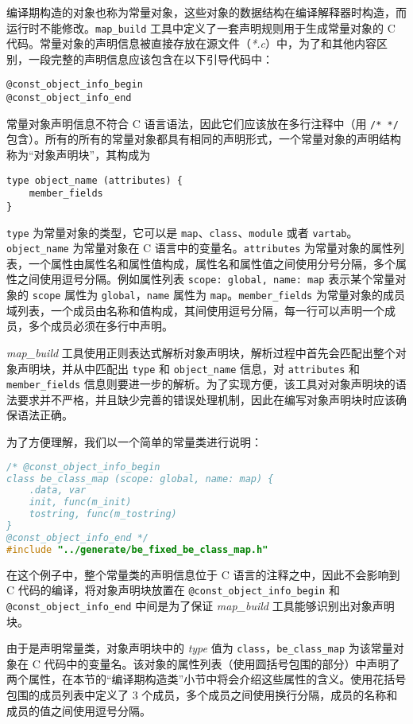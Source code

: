编译期构造的对象也称为常量对象，这些对象的数据结构在编译解释器时构造，而运行时不能修改。\texttt{map\_build} 工具中定义了一套声明规则用于生成常量对象的 C 代码。常量对象的声明信息被直接存放在源文件（\textsl{*.c}）中，为了和其他内容区别，一段完整的声明信息应该包含在以下引导代码中：
\begin{lstlisting}[numbers=none]
@const_object_info_begin
@const_object_info_end
\end{lstlisting}
常量对象声明信息不符合 C 语言语法，因此它们应该放在多行注释中（用 \texttt{/* */} 包含）。所有的所有的常量对象都具有相同的声明形式，一个常量对象的声明结构称为``对象声明块''，其构成为
\begin{lstlisting}[numbers=none]
type object_name (attributes) {
    member_fields
}
\end{lstlisting}
\texttt{type} 为常量对象的类型，它可以是 \texttt{map}、\texttt{class}、\texttt{module} 或者 \texttt{vartab}。\texttt{object\_name} 为常量对象在 C 语言中的变量名。\texttt{attributes} 为常量对象的属性列表，一个属性由属性名和属性值构成，属性名和属性值之间使用分号分隔，多个属性之间使用逗号分隔。例如属性列表 \texttt{scope: global, name: map} 表示某个常量对象的 \texttt{scope} 属性为 \texttt{global}，\texttt{name} 属性为 \texttt{map}。\texttt{member\_fields} 为常量对象的成员域列表，一个成员由名称和值构成，其间使用逗号分隔，每一行可以声明一个成员，多个成员必须在多行中声明。

\textsl{map\_build} 工具使用正则表达式解析对象声明块，解析过程中首先会匹配出整个对象声明块，并从中匹配出 \texttt{type} 和 \texttt{object\_name} 信息，对 \texttt{attributes} 和 \texttt{member\_fields} 信息则要进一步的解析。为了实现方便，该工具对对象声明块的语法要求并不严格，并且缺少完善的错误处理机制，因此在编写对象声明块时应该确保语法正确。

为了方便理解，我们以一个简单的常量类进行说明：
\begin{lstlisting}[language=c]
/* @const_object_info_begin
class be_class_map (scope: global, name: map) {
    .data, var
    init, func(m_init)
    tostring, func(m_tostring)
}
@const_object_info_end */
#include "../generate/be_fixed_be_class_map.h"
\end{lstlisting}
在这个例子中，整个常量类的声明信息位于 C 语言的注释之中，因此不会影响到 C 代码的编译，将对象声明块放置在 \texttt{@const\_object\_info\_begin} 和 \texttt{@const\_object\_info\_end} 中间是为了保证 \textsl{map\_build} 工具能够识别出对象声明块。

由于是声明常量类，对象声明块中的 \textsl{type} 值为 \texttt{class}，\texttt{be\_class\_map} 为该常量对象在 C 代码中的变量名。该对象的属性列表（使用圆括号包围的部分）中声明了两个属性，在本节的``编译期构造类''小节中将会介绍这些属性的含义。使用花括号包围的成员列表中定义了 3 个成员，多个成员之间使用换行分隔，成员的名称和成员的值之间使用逗号分隔。

